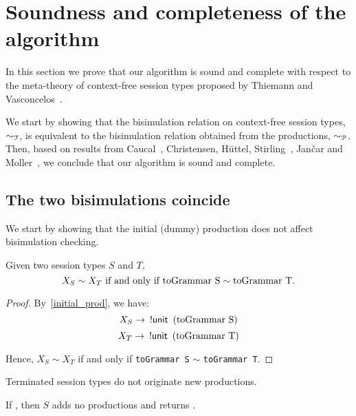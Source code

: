 \section{Soundness and completeness of the algorithm}
\label{sec:soundness}

In this section we prove that our algorithm is sound and complete
with respect to the meta-theory of context-free session types proposed
by Thiemann and Vasconcelos~\cite{thiemann2016context}.

We start by showing that the bisimulation relation on context-free
session types, $\sim_{\mathcal T}$, is equivalent to the bisimulation
relation obtained from the productions, $\sim_{\mathcal P}$.  Then, based on
results from Caucal~\cite{caucal1986decidabilite}, Christensen,
H{\"{u}}ttel, Stirling~\cite{DBLP:journals/iandc/ChristensenHS95},
Jan{\v{c}}ar and Moller~\cite{janvcar1999techniques}, we conclude that
our algorithm is sound and complete.

\subsection{The two bisimulations coincide}

We start by showing that the initial (dummy) production does not
affect bisimulation checking.
%
\begin{lemma}
	Given two session types $S$ and $T$,
	\[ X_{S} \sim X_{T}  \text{ if and only if }
	\text{\lstinline{toGrammar S}} \sim \text{\lstinline{toGrammar T}}.\]
\end{lemma}

\begin{proof}
	By~\eqref{initial_prod}, we have:
	\[X_S \rightarrow \enspace \initialProd\enspace \text{(\lstinline{toGrammar S})}\]
    \[X_T \rightarrow \enspace \initialProd\enspace \text{(\lstinline{toGrammar T})}\]

Hence, $X_S\sim X_T$ if and only if
\lstinline{toGrammar S} $\sim$ \lstinline{toGrammar T}.
\end{proof}

Terminated session types do not originate new productions.

\begin{lemma}
  \label{lemma:terminated_session}
  If , then $S$ adds no
  productions and returns \upshape{\lstinline|[]|}.
\end{lemma}

